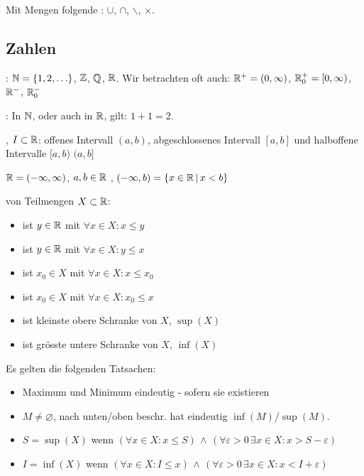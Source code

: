 \Def Mit Mengen folgende :
$\cup$, $\cap$, $\backslash$, $\times$.

\subsection{Zahlen}

\Def {}: $\mathbb{N} = \{1, 2, \ldots\}$, $\mathbb{Z}$, $\mathbb{Q}$, $\mathbb{R}$.
Wir betrachten oft auch: $\mathbb{R}^+ = (0, \infty)$, $\mathbb{R}^+_0 = [0, \infty)$, $\mathbb{R}^-$, $\mathbb{R}^-_0$

\Satz {}: In $\mathbb{N}$, oder auch in $\mathbb{R}$, gilt: $1 + 1 = 2$.

\Def {}, $I \subset \mathbb{R}$:
offenes Intervall $(a, b)$, abgeschlossenes Intervall $[a, b]$ und halboffene Intervalle $[a, b)$ $(a, b]$

$\mathbb{R} = (-\infty, \infty)$, $a, b \in \mathbb{R}$ ,
$(-\infty, b) = \{x \in \mathbb{R} \, | \, x < b\}$

\Def {} von Teilmengen $X \subset \mathbb{R}$:
\vspace{-0.6em}
\begin{itemize}
    \item {} ist $y \in \mathbb{R}$ mit $\forall x \in X : x\le y$
    \item {} ist $y \in \mathbb{R}$ mit $\forall x \in X : y\le x$
    \item {} ist $x_0 \in X$ mit $\forall x \in X : x\le x_0$
    \item {} ist $x_0 \in X$ mit $\forall x \in X : x_0\le x$
    \item {} ist kleinste obere Schranke von $X$, $\sup(X)$
    \item {} ist grösste untere Schranke von $X$, $\inf(X)$
\end{itemize}

\Satz
Es gelten die folgenden Tatsachen:
\vspace{-0.6em}
\begin{itemize}
    \item Maximum und Minimum eindeutig - sofern sie existieren
    \item $M\ne \varnothing$, nach unten/oben beschr. hat eindeutig $\inf(M)$/$\sup(M)$.
    \item $S = \sup(X)$ wenn $(\forall x \in X : x\le S) \, \land \, (\forall \varepsilon > 0 \, \exists x \in X : x > S - \varepsilon)$
    \item $I = \inf(X)$ wenn $(\forall x \in X : I\le x) \, \land \, (\forall \varepsilon > 0 \, \exists x \in X : x < I + \varepsilon)$
\end{itemize}

